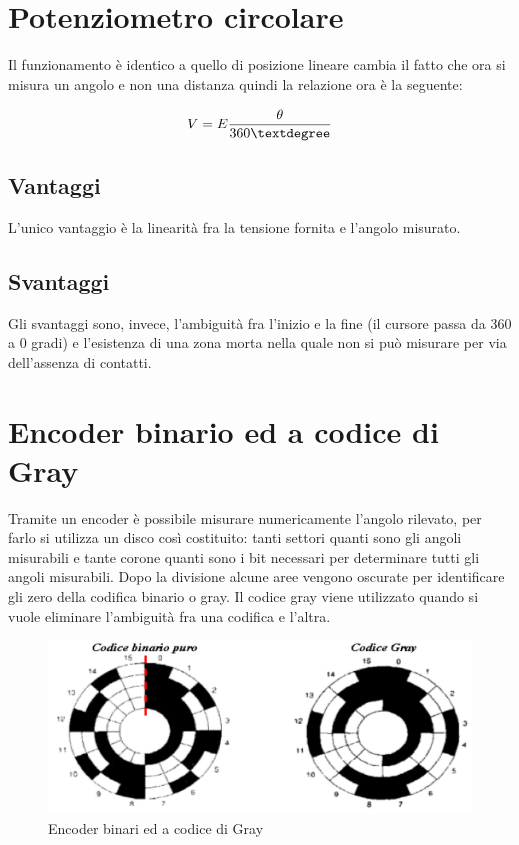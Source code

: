 \section{Potenziometro circolare}
Il funzionamento è identico a quello di posizione lineare cambia il
fatto che ora si misura un angolo e non una distanza quindi la
relazione ora è la seguente:

	\[V=E\frac{\theta}{360\textdegree}\]

\subsection{Vantaggi}
L'unico vantaggio è la linearità fra la tensione fornita e l'angolo
misurato.
\subsection{Svantaggi}
Gli svantaggi sono, invece, l'ambiguità fra l'inizio e la fine (il
cursore passa da 360 a 0 gradi) e l'esistenza di una zona morta nella
quale non si può misurare per via dell'assenza di contatti.

\section{Encoder binario ed a codice di Gray}
Tramite un encoder è possibile misurare numericamente l'angolo
rilevato, per farlo si utilizza un disco così costituito: tanti
settori quanti sono gli angoli misurabili e tante corone quanti sono i
bit necessari per determinare tutti gli angoli misurabili. Dopo la
divisione alcune aree vengono oscurate per identificare gli zero della
codifica binario o gray. Il codice gray viene utilizzato quando si
vuole eliminare l'ambiguità fra una codifica e l'altra.

\begin{figure}[htbp]
	\centering
	\includegraphics[scale=0.5]
			{img/encoder.png}
	\caption{Encoder binari ed a codice di
Gray\label{fig:encored}}
\end{figure}

